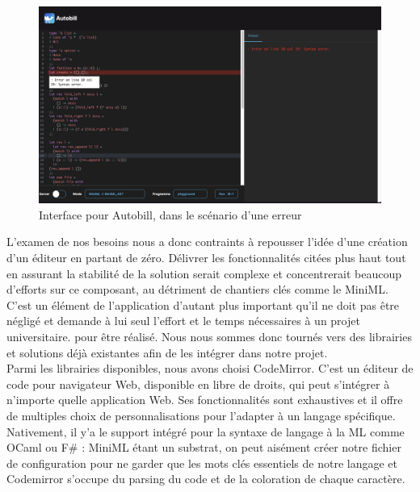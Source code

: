 \documentclass[12pt]{article}
\begin{document}
\begin{figure}
      \centering
      \includegraphics[scale=0.36]{Figures/screen.png}
      \caption{Interface pour Autobill, dans le scénario d'une erreur}
\end{figure}
L'examen de nos besoins nous a donc contraints à repousser l'idée d'une création d'un éditeur en partant de zéro. Délivrer les fonctionnalités citées plus haut tout en assurant la stabilité de la solution serait complexe et concentrerait beaucoup d'efforts sur ce composant, au détriment de chantiers clés comme le MiniML. C'est un élément de l'application d'autant plus important qu'il ne doit pas être négligé et demande à lui seul l'effort et le temps nécessaires à un projet universitaire. pour être réalisé. Nous nous sommes donc tournés vers des librairies et solutions déjà existantes afin de les intégrer dans notre projet. \\

Parmi les librairies disponibles, nous avons choisi CodeMirror. C'est un éditeur de code pour navigateur Web, disponible en libre de droits, qui peut s'intégrer à n'importe quelle application Web. Ses fonctionnalités sont exhaustives et il offre de multiples choix de personnalisations pour l'adapter à un langage spécifique. Nativement, il y'a le support intégré pour la syntaxe de langage à la ML comme OCaml ou F\# : MiniML étant un substrat, on peut aisément créer notre fichier de configuration pour ne garder que les mots clés essentiels de notre langage et Codemirror s'occupe du parsing du code et de la coloration de chaque caractère. \\
\end{document}

